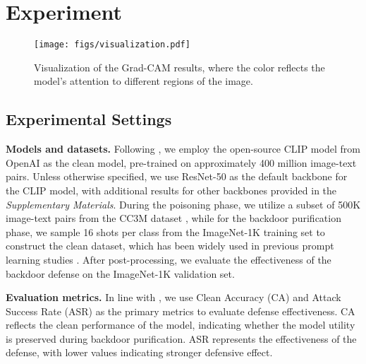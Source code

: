 \section{Experiment}
\label{experiment}

\begin{figure}[t]
\begin{center}
\texttt{[image: figs/visualization.pdf]}
\end{center}
\caption{Visualization of the Grad-CAM results, where the color reflects the model's attention to different regions of the image.}
\label{fig:visialization}
\end{figure}


\subsection{Experimental Settings}
\textbf{Models and datasets.}
Following \cite{bansal2023cleanclip, liang2024badclip}, we employ the open-source CLIP model from OpenAI \cite{radford2021learning} as the clean model, pre-trained on approximately 400 million image-text pairs. Unless otherwise specified, we use ResNet-50 as the default backbone for the CLIP model, with additional results for other backbones provided in the \textit{Supplementary Materials}. During the poisoning phase, we utilize a subset of 500K image-text pairs from the CC3M dataset \cite{sharma2018conceptual}, while for the backdoor purification phase, we sample 16 shots per class from the ImageNet-1K \cite{deng2009imagenet} training set to construct the clean dataset, which has been widely used in previous prompt learning studies \cite{zhou2022learning, zhou2022conditional, li2024one}. After post-processing, we evaluate the effectiveness of the backdoor defense on the ImageNet-1K validation set.


\textbf{Evaluation metrics.}
In line with \cite{gu2019badnets, liang2024badclip}, we use Clean Accuracy (CA) and Attack Success Rate (ASR) as the primary metrics to evaluate defense effectiveness. CA reflects the clean performance of the model, indicating whether the model utility is preserved during backdoor purification. ASR represents the effectiveness of the defense, with lower values indicating stronger defensive effect.


